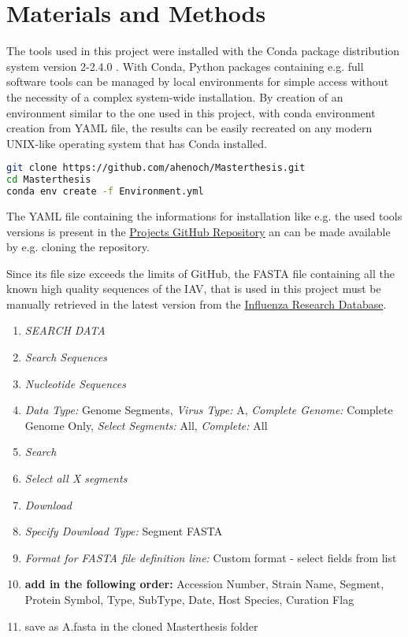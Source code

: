 \chapter{Materials and Methods} \label{chap:Materials_and_Methods}

The tools used in this project were installed with the Conda package distribution system version 2-2.4.0 \autocite{anaconda_software_distribution_anaconda_2020}. With Conda, Python packages containing e.g. full software tools can be managed by local environments for simple access without the necessity of a complex system-wide installation. By creation of an environment similar to the one used in this project, with conda environment creation from YAML file, the results can be easily recreated on any modern UNIX-like operating system that has Conda installed. 

\begin{lstlisting}[language=sh]
git clone https://github.com/ahenoch/Masterthesis.git
cd Masterthesis
conda env create -f Environment.yml
\end{lstlisting}  

The YAML file containing the informations for installation like e.g. the used tools versions is present in the \href{https://github.com/ahenoch/Masterthesis.git}{Projects GitHub Repository} an can be made available by e.g. cloning the repository.

Since its file size exceeds the limits of GitHub, the FASTA file containing all the known high quality sequences of the \gls{IAV}, that is used in this project must be manually retrieved in the latest version from the \href{https://www.fludb.org/brc/home.spg?decorator=influenza}{Influenza Research Database}.

\begin{enumerate}[noitemsep]
    \item \textit{SEARCH DATA}
    \item \textit{Search Sequences}
    \item \textit{Nucleotide Sequences}
    \item \textit{Data Type:} Genome Segments, \textit{Virus Type:} A, \textit{Complete Genome:} Complete Genome Only, \textit{Select Segments:} All, \textit{Complete:} All
    \item \textit{Search}
    \item \textit{Select all X segments}
    \item \textit{Download}
    \item \textit{Specify Download Type:} Segment FASTA
    \item \textit{Format for FASTA file definition line:}  Custom format - select fields from list
    \item \textbf{add in the following order:} Accession Number, Strain Name, Segment, Protein Symbol, Type, SubType, Date, Host Species, Curation Flag
    \item save as A.fasta in the cloned Masterthesis folder
\end{enumerate}

